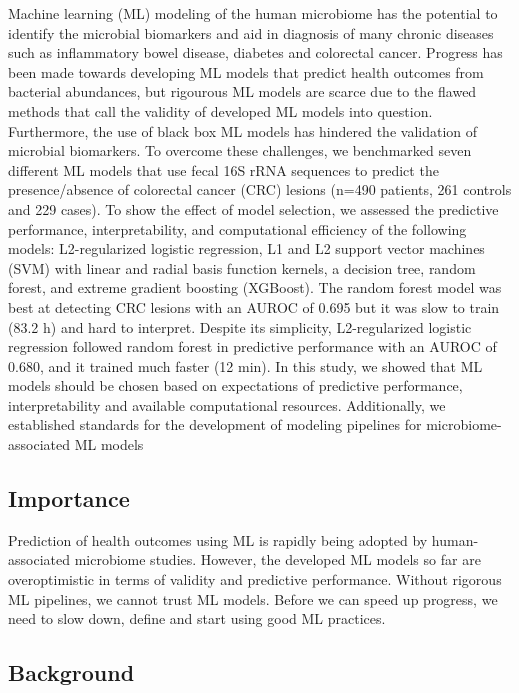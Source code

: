 \documentclass[11pt,]{article}
\begin{document}
Machine learning (ML) modeling of the human microbiome has the potential
to identify the microbial biomarkers and aid in diagnosis of many
chronic diseases such as inflammatory bowel disease, diabetes and
colorectal cancer. Progress has been made towards developing ML models
that predict health outcomes from bacterial abundances, but rigourous ML
models are scarce due to the flawed methods that call the validity of
developed ML models into question. Furthermore, the use of black box ML
models has hindered the validation of microbial biomarkers. To overcome
these challenges, we benchmarked seven different ML models that use
fecal 16S rRNA sequences to predict the presence/absence of colorectal
cancer (CRC) lesions (n=490 patients, 261 controls and 229 cases). To
show the effect of model selection, we assessed the predictive
performance, interpretability, and computational efficiency of the
following models: L2-regularized logistic regression, L1 and L2 support
vector machines (SVM) with linear and radial basis function kernels, a
decision tree, random forest, and extreme gradient boosting (XGBoost).
The random forest model was best at detecting CRC lesions with an AUROC
of 0.695 but it was slow to train (83.2 h) and hard to interpret.
Despite its simplicity, L2-regularized logistic regression followed
random forest in predictive performance with an AUROC of 0.680, and it
trained much faster (12 min). In this study, we showed that ML models
should be chosen based on expectations of predictive performance,
interpretability and available computational resources. Additionally, we
established standards for the development of modeling pipelines for
microbiome-associated ML models

\newpage

\subsection{Importance}\label{importance}

Prediction of health outcomes using ML is rapidly being adopted by
human-associated microbiome studies. However, the developed ML models so
far are overoptimistic in terms of validity and predictive performance.
Without rigorous ML pipelines, we cannot trust ML models. Before we can
speed up progress, we need to slow down, define and start using good ML
practices. \newpage

\subsection{Background}\label{background}
\end{document}
